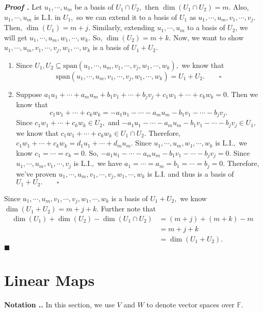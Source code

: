 \documentclass[11pt, letterpaper]{article}
\newcounter{index}[subsection]
\newenvironment*{nota}{\par\noindent\textbf{Notation \thesubsection.\stepcounter{index}\theindex.}}{\par}
\newcounter{nprf}[subsection]
\newenvironment*{prf}{\par\indent\textbf{\textit{Proof \stepcounter{nprf}\thenprf.}}}{\hfill$\blacksquare$\par}
\def\F{\mathbb{F}}
\def\LI{\mathrm{L.I.}}
\def\span{\mathrm{span}}
\begin{document}
\begin{prf}
	Let $u_1,\cdots,u_m$ be a basis of $U_1\cap U_2,$ then $\dim(U_1\cap U_2)=m.$ Also, $u_1,\cdots,u_m$ is $\LI$ in $U_1,$ so we can extend it to a basis of $U_1$ as $u_1,\cdots,u_m,v_1,\cdots,v_j.$ Then, $\dim(U_1)=m+j.$ Similarly, extending $u_1,\cdots,u_m$ to a basis of $U_2$, we will get $u_1,\cdots,u_m,w_1,\cdots,w_k.$ So, $\dim(U_2)=m+k.$ Now, we want to show $u_1,\cdots,u_m,v_1,\cdots,v_j,w_1,\cdots,w_k$ is a basis of $U_1+U_2.$
	\begin{enumerate}
		\item Since $U_1,U_2\subseteq\span(u_1,\cdots,u_m,v_1,\cdots,v_j,w_1,\cdots,w_k),$ we know that \[\span(u_1,\cdots,u_m,v_1,\cdots,v_j,w_1,\cdots,w_k)=U_1+U_2.\qquad\square\]
		\item Suppose $a_1u_1+\cdots+a_mu_m+b_1v_1+\cdots+b_jv_j+c_1w_1+\cdots+c_kw_k=0.$ Then we know that \[c_1w_1+\cdots+c_kw_k=-a_1u_1-\cdots-a_mu_m-b_1v_1-\cdots-b_jv_j.\] Since $c_1w_1+\cdots+c_kw_k\in U_2,$ and $-a_1u_1-\cdots-a_mu_m-b_1v_1-\cdots-b_jv_j\in U_1,$ we know that $c_1w_1+\cdots+c_kw_k\in U_1\cap U_2.$ Therefore, $c_1w_1+\cdots+c_kw_k=d_1u_1+\cdots+d_mu_m.$ Since $u_1,\cdots,u_m,w_1,\cdots,w_k$ is $\LI,$ we know $c_1=\cdots=c_k=0.$ So, $-a_1u_1-\cdots-a_mu_m-b_1v_1-\cdots-b_jv_j=0.$ Since $u_1,\cdots,u_m,v_1,\cdots,v_j$ is $\LI,$ we have $a_1=\cdots=a_m=b_1=\cdots=b_j=0.$ Therefore, we've proven $u_1,\cdots,u_m,v_1,\cdots,v_j,w_1,\cdots,w_k$ is $\LI$ and thus is a basis of $U_1+U_2.\qquad\square$
	\end{enumerate}
	Since $u_1,\cdots,u_m,v_1,\cdots,v_j,w_1,\cdots,w_k$ is a basis of $U_1+U_2,$ we know $\dim(U_1+U_2)=m+j+k.$ Further note that \[\begin{aligned}\dim(U_1)+\dim(U_2)-\dim(U_1\cap U_2)&=(m+j)+(m+k)-m\\&=m+j+k\\&=\dim(U_1+U_2).\end{aligned}\]
\end{prf}

\newpage
\section{Linear Maps}
\begin{nota}
	In this section, we use $V$ and $W$ to denote vector spaces over $\F$.
\end{nota}
\end{document}
